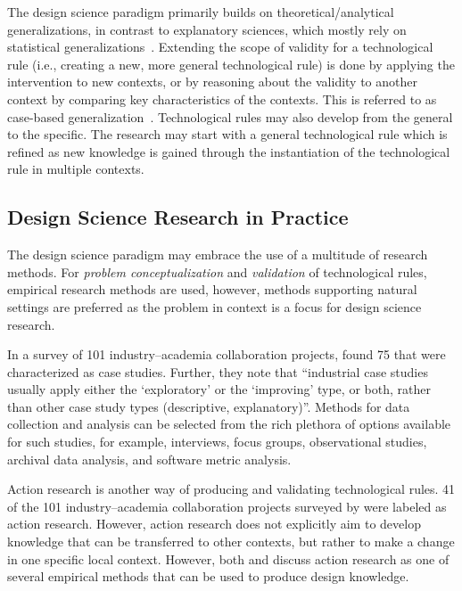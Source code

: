 \documentclass[graybox]{svmult}
\begin{document}
The design science paradigm primarily builds on theoretical/analytical generalizations, in contrast to explanatory sciences, which mostly rely on statistical generalizations~\citep{Runeson12Case}. Extending the scope of validity for a technological rule (i.e., creating a new, more general technological rule) is done by applying the intervention to new contexts, or by reasoning about the validity to another context by comparing key characteristics of the contexts. This is referred to as case-based generalization~\citep{wieringa_six_2015}.  
Technological rules may also develop from the general to the specific. The research may start with a general technological rule which is refined as new knowledge is gained through the instantiation of the technological rule in multiple contexts. 


\subsection{Design Science Research in Practice} 
The design science paradigm may embrace the use of a multitude of research methods. For \emph{problem conceptualization} and \emph{validation} of technological rules, empirical research methods are used, however, methods supporting natural settings are preferred as the problem in context is a focus for design science research. 



In a survey of 101 industry--academia collaboration projects, \cite{Garousi2019} found 75 that were characterized as case studies. Further, they note that ``industrial case studies usually apply either the `exploratory' or the `improving' type, or both, rather than other case study types (descriptive, explanatory)''. Methods for data collection and analysis can be selected from the rich plethora of options available for such studies, for example, interviews, focus groups, observational studies, archival data analysis, and software metric analysis. 


Action research is another way of producing and validating technological rules.  41 of the 101 industry--academia collaboration projects surveyed by \cite{Garousi2019} were labeled as action research. However, action research does not explicitly aim to develop knowledge that can be transferred to other contexts, but rather to make a change in one specific local context. However, both \cite{wieringa_technical_2012} and \cite{johannesson_introduction_2014} discuss action research as one of several empirical methods that can be used to produce design knowledge.
\end{document}
